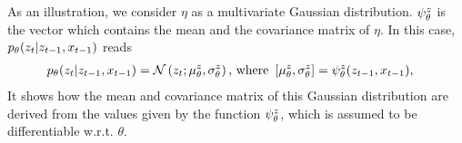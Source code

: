 \begin{example}
    \label{ex:gaussian}
    As an illustration, we consider $\eta$ as a multivariate  Gaussian distribution. 
    $\psi^{z}_{\theta}$  is the vector which contains the mean and the covariance matrix of $\eta$. 
    In this case, $p_{\theta}(z_t|z_{t-1},x_{t-1})$ reads 
    \begin{align*}
        p_{\theta}(z_t|z_{t-1},x_{t-1})  &= 
        {\mathcal N}\left(z_t;  \mu_{\theta}^{z} , \sigma_{\theta}^{z} \right)   \text{, where }   
        \left[ \mu_{\theta}^{z} , \sigma_{\theta}^{z} \right]= 
        \psi^{z}_{\theta}(z_{t-1},x_{t-1}) \text{,} 
    \end{align*}
    It shows how the mean and covariance matrix of this Gaussian distribution are derived
    from the values given by the function $\psi^{z}_{\theta}$, 
    which is assumed to be differentiable w.r.t. $\theta$.
\end{example}


